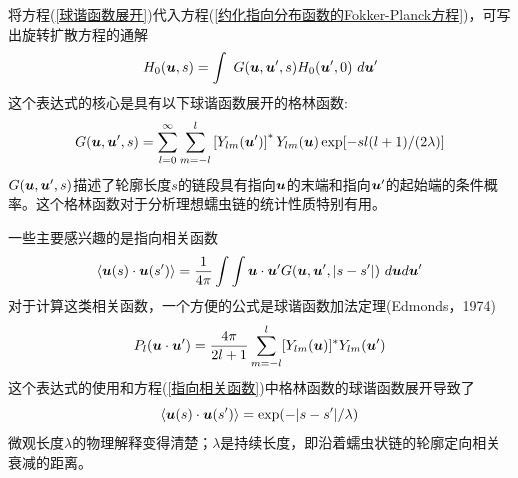 将方程(\ref{球谐函数展开})代入方程(\ref{约化指向分布函数的Fokker-Planck方程})，可写出旋转扩散方程的通解
\begin{equation}
H_0(\bu,s)=\int \ G(\bu,\bu',s)H_0(\bu',0)\ d\bu'
\end{equation}
这个表达式的核心是具有以下球谐函数展开的格林函数:\\
\begin{equation}
G(\bm{u},\bm{u}',s) = \sum_{l=0}^{\infty}\sum_{m=-l}^{l}\left[Y_{lm}(\bm{u}')\right]^*Y_{lm}(\bm{u})\exp[-sl(l+1)/(2\lambda)]
\end{equation}
$G(\bm{u},\bm{u}',s)$描述了轮廓长度$s$的链段具有指向$\bm{u}$的末端和指向$\bm{u}'$的起始端的条件概率。这个格林函数对于分析理想蠕虫链的统计性质特别有用。

一些主要感兴趣的是指向相关函数\\
\begin{equation}
	\langle \bm{u}(s)\cdot \bm{u}(s')\rangle =\frac{1}{4\pi}\int \int \bm{u}\cdot \bm{u}'G(\bm{u},\bm{u}',|s-s'|)\ d\bm{u} d\bm{u}'\label{指向相关函数}
\end{equation}
对于计算这类相关函数，一个方便的公式是球谐函数加法定理(Edmonds，1974)\\
\begin{equation}
P_l(\bm{u}\cdot \bm{u}')=\frac{4\pi}{2l+1}\sum_{m=-l}^{l}[Y_{lm}(\bm{u})]^*Y_{lm}(\bm{u}')
\end{equation}
这个表达式的使用和方程(\ref{指向相关函数})中格林函数的球谐函数展开导致了\\
\begin{equation}
	\langle \bm{u}(s) \cdot \bm{u}(s')\rangle=\exp(-|s-s'|/\lambda)\label{简化的指向相关函数}
\end{equation}
微观长度$λ$的物理解释变得清楚；$λ$是持续长度，即沿着蠕虫状链的轮廓定向相关衰减的距离。\\

